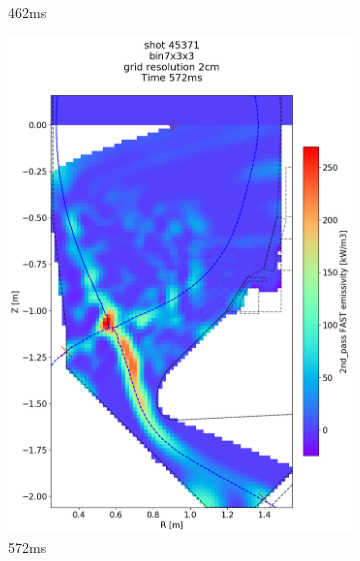 \begin{figure}[!ht]
\begin{subfigure}{0.395\linewidth}
         \vspace*{-6.5mm}
         \caption{462ms}
         \label{fig:45371_export2_1}
     \end{subfigure}
     \begin{subfigure}{0.395\linewidth}
         \centering
         \includegraphics[trim={75 40 0 190},clip,width=\textwidth]{Chapters/chapter2/figs/IRVB-MASTU_shot-45371_export_8.png}
         \vspace*{-6.5mm}
         \caption{572ms}
         \label{fig:45371_export2_2}
     \end{subfigure}
     \begin{subfigure}{0.395\linewidth}
         \centering

\end{subfigure}
\end{figure}
